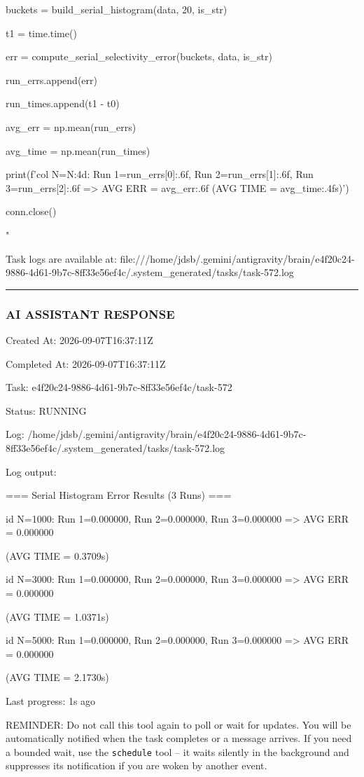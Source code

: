 \documentclass[11pt,a4paper]{article}
\begin{document}
buckets = build\_serial\_histogram(data, 20, is\_str)

t1 = time.time()

err = compute\_serial\_selectivity\_error(buckets, data, is\_str)

run\_errs.append(err)

run\_times.append(t1 - t0)

avg\_err = np.mean(run\_errs)

avg\_time = np.mean(run\_times)

print(f'{col} N={N:4d}: Run 1={run\_errs[0]:.6f}, Run 2={run\_errs[1]:.6f}, Run 3={run\_errs[2]:.6f} => AVG ERR = {avg\_err:.6f} (AVG TIME = {avg\_time:.4f}s)')


conn.close()

"

Task logs are available at: file:///home/jdsb/.gemini/antigravity/brain/e4f20c24-9886-4d61-9b7c-8ff33e56ef4c/.system\_generated/tasks/task-572.log


\hrule

\subsubsection{AI ASSISTANT RESPONSE}

Created At: 2026-09-07T16:37:11Z

Completed At: 2026-09-07T16:37:11Z

Task: e4f20c24-9886-4d61-9b7c-8ff33e56ef4c/task-572

Status: RUNNING

Log: /home/jdsb/.gemini/antigravity/brain/e4f20c24-9886-4d61-9b7c-8ff33e56ef4c/.system\_generated/tasks/task-572.log

Log output:

=== Serial Histogram Error Results (3 Runs) ===

id N=1000: Run 1=0.000000, Run 2=0.000000, Run 3=0.000000 => AVG ERR = 0.000000

(AVG TIME = 0.3709s)

id N=3000: Run 1=0.000000, Run 2=0.000000, Run 3=0.000000 => AVG ERR = 0.000000

(AVG TIME = 1.0371s)

id N=5000: Run 1=0.000000, Run 2=0.000000, Run 3=0.000000 => AVG ERR = 0.000000

(AVG TIME = 2.1730s)


Last progress: 1s ago



REMINDER: Do not call this tool again to poll or wait for updates. You will be automatically notified when the task completes or a message arrives. If you need a bounded wait, use the \texttt{schedule} tool -- it waits silently in the background and suppresses its notification if you are woken by another event.
\end{document}
